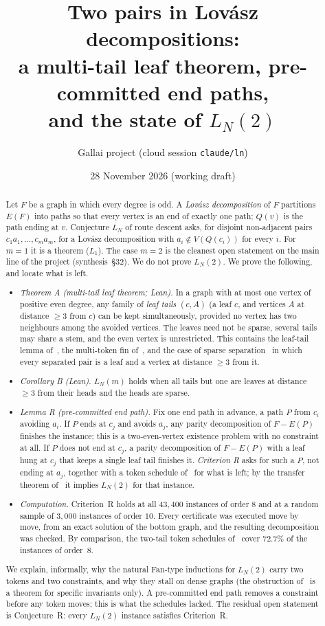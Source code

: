 \documentclass[11pt]{amsart}
\title[Two pairs in Lov\'asz decompositions]{Two pairs in Lov\'asz decompositions:\\
a multi-tail leaf theorem, pre-committed end paths,\\ and the state of $L_N(2)$}
\author{Gallai project (cloud session \texttt{claude/ln})}
\date{28 November 2026 (working draft)}
\theoremstyle{definition}
\begin{document}
\begin{abstract}
Let $F$ be a graph in which every degree is odd. A \emph{Lov\'asz decomposition} of $F$ partitions
$E(F)$ into paths so that every vertex is an end of exactly one path; $Q(v)$ is the path ending at
$v$. Conjecture $L_N$ of route descent asks, for disjoint non-adjacent pairs $c_1a_1,\dots,c_ma_m$,
for a Lov\'asz decomposition with $a_i\notin V(Q(c_i))$ for every $i$. For $m=1$ it is a theorem
($L_1$). The case $m=2$ is the cleanest open statement on the main line of the project
(synthesis~\S32). We do not prove $L_N(2)$. We prove the following, and locate what is left.
\begin{itemize}
\item \emph{Theorem A (multi-tail leaf theorem; Lean).} In a graph with at most one vertex of
positive even degree, any family of \emph{leaf tails} $(c,A)$ (a leaf $c$, and vertices $A$ at
distance $\ge3$ from $c$) can be kept simultaneously, provided no vertex has two neighbours among the
avoided vertices. The leaves need not be sparse, several tails may share a stem, and the even
vertex is unrestricted. This contains the leaf-tail lemma of~\cite{TRN}, the multi-token fin
of~\cite{MT}, and the case of sparse separation~\cite{MS} in which every separated pair is a leaf
and a vertex at distance $\ge3$ from it.
\item \emph{Corollary B (Lean).} $L_N(m)$ holds when all tails but one are leaves at distance
$\ge3$ from their heads and the heads are sparse.
\item \emph{Lemma R (pre-committed end path).} Fix one end path in advance, a path $P$ from $c_i$
avoiding $a_i$. If $P$ ends at $c_j$ and avoids $a_j$, any parity decomposition of $F-E(P)$ finishes
the instance; this is a two-even-vertex existence problem with no constraint at all. If $P$ does
not end at $c_j$, a parity decomposition of $F-E(P)$ with a leaf hung at $c_j$ that keeps a single
leaf tail finishes it. \emph{Criterion R} asks for such a $P$, not ending at $a_j$, together with a
token schedule of~\cite{MT} for what is left; by the transfer theorem of~\cite{MT} it implies
$L_N(2)$ for that instance.
\item \emph{Computation.} Criterion~R holds at all $43{,}400$ instances of order $8$ and at a random
sample of $3{,}000$ instances of order $10$. Every certificate was executed move by move, from an
exact solution of the bottom graph, and the resulting decomposition was checked. By comparison, the two-tail token schedules
of~\cite{MT} cover $72.7\%$ of the instances of order~$8$.
\end{itemize}
We explain, informally, why the natural Fan-type inductions for $L_N(2)$ carry two tokens and two
constraints, and why they stall on dense graphs (the obstruction of~\cite{MT} is a theorem for
specific invariants only). A pre-committed end path removes a constraint before any token moves;
this is what the schedules lacked. The residual open statement is Conjecture~R: every $L_N(2)$
instance satisfies Criterion~R.
\end{abstract}
\maketitle
\end{document}

